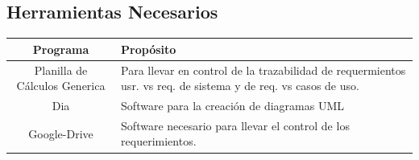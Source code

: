 \subsection{\textcolor[gray]{.2}{Herramientas Necesarios}}
\begin{table}[h!]
\begin{center}
\begin{tabular}{|c|p{100mm}|}
\hline
\rowcolor[gray]{.8} Programa & Propósito \\
\hline
Planilla de Cálculos Generica & Para llevar en control de la trazabilidad
de requermientos usr. vs req. de sistema y de req. vs casos de uso.\\
\hline
Dia & Software para la creación de diagramas UML\\
\hline
Google-Drive & Software necesario para llevar el control de los requerimientos.\\
\hline
\end{tabular}
\end{center}
\end{table}



